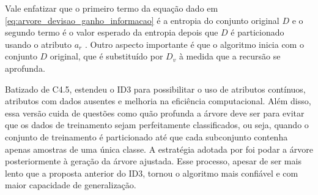 Vale enfatizar que o primeiro termo da equação dado em \ref{eq:arvore_devisao_ganho_informacao} é a entropia do conjunto original $D$ e o segundo termo é o valor esperado da entropia depois que $D$ é particionado usando o atributo $a_r$ \citep{mitchell:97}. Outro aspecto importante é que o algoritmo inicia com o conjunto $D$ original, que é substituído por $D_v$ à medida que a recursão se aprofunda.

Batizado de C4.5, \citet{quinlan:93} estendeu o ID3 para possibilitar o uso de atributos contínuos, atributos com dados ausentes e melhoria na eficiência computacional. Além disso, essa versão cuida de questões como quão profunda a árvore deve ser para evitar que os dados de treinamento sejam perfeitamente classificados, ou seja, quando o conjunto de treinamento é particionado até que cada subconjunto contenha apenas amostras de uma única classe. A estratégia adotada por \citet{quinlan:93} foi podar a árvore posteriormente à geração da árvore ajustada. Esse processo, apesar de ser mais lento que a proposta anterior do ID3, tornou o algoritmo mais confiável e com maior capacidade de generalização.


